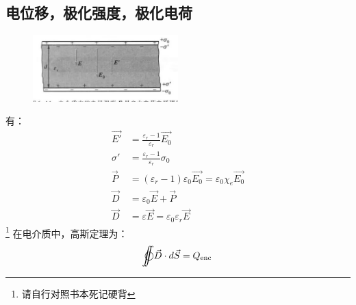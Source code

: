 \documentclass{ctexart}
\def\ooint{{\bigcirc}\kern-12.5pt{\int}\kern-7.5pt{\int}}
\begin{document}
\subsection{电位移，极化强度，极化电荷}
\begin{figure}[H]
    \centering
    \includegraphics[width=0.5\textwidth]{img/6-14.jpg}
\end{figure}
有：
\begin{align*}
    \vec{E'} &= \frac{\varepsilon_r -1}{\varepsilon_r} \vec{E_0} \\
    \sigma' &= \frac{\varepsilon_r -1}{\varepsilon_r} \sigma_0 \\
    \vec{P} &= (\varepsilon_r -1) \varepsilon_0 \vec{E_0} = \varepsilon_0 \chi_e \vec{E_0} \\
    \vec{D} &= \varepsilon_0 \vec{E} + \vec{P} \\
    \vec{D} &= \varepsilon \vec{E} = \varepsilon_0 \varepsilon_r \vec{E}
\end{align*}
\footnote{请自行对照书本死记硬背}
在电介质中，高斯定理为：
$$
    \ooint \vec{D} \cdot d\vec{S} = Q_{\text{enc}}
$$
\end{document}
